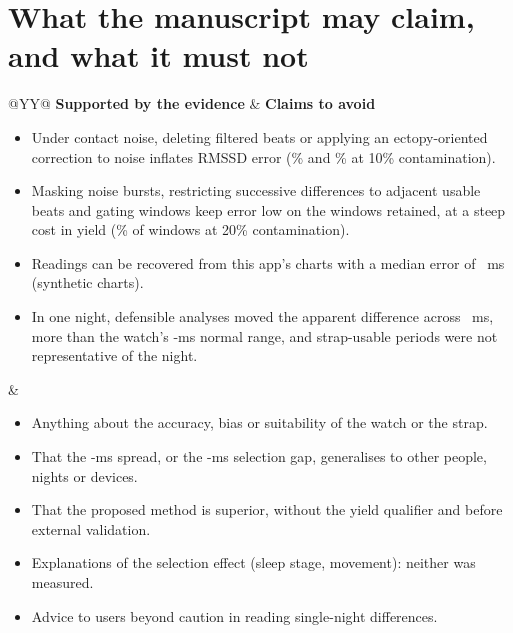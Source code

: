 \documentclass[11pt,a4paper]{article}
\begin{document}
\section{What the manuscript may claim, and what it must not}
\begin{tabularx}{\textwidth}{@{}YY@{}}
\toprule
\textbf{Supported by the evidence} & \textbf{Claims to avoid} \\
\midrule
\vspace{-6pt}
\begin{itemize}[leftmargin=1.1em, after=\vspace*{-\baselineskip}]
\item Under contact noise, deleting filtered beats or applying an ectopy-oriented correction to noise inflates RMSSD error (\benchDeleteTen\% and \benchKubiosTen\% at 10\% contamination).
\item Masking noise bursts, restricting successive differences to adjacent usable beats and gating windows keep error low on the windows retained, at a steep cost in yield (\benchProposedYieldTwenty\% of windows at 20\% contamination).
\item Readings can be recovered from this app's charts with a median error of \digValueMedian{}~ms (synthetic charts).
\item In one night, defensible analyses moved the apparent difference across \pitDefRange{}~ms, more than the watch's \normalWidth-ms normal range, and strap-usable periods were not representative of the night.
\end{itemize}
&
\vspace{-6pt}
\begin{itemize}[leftmargin=1.1em, after=\vspace*{-\baselineskip}]
\item Anything about the accuracy, bias or suitability of the watch or the strap.
\item That the \pitDefRange-ms spread, or the \qualityGap-ms selection gap, generalises to other people, nights or devices.
\item That the proposed method is superior, without the yield qualifier and before external validation.
\item Explanations of the selection effect (sleep stage, movement): neither was measured.
\item Advice to users beyond caution in reading single-night differences.
\end{itemize}
\\
\bottomrule
\end{tabularx}
\end{document}
